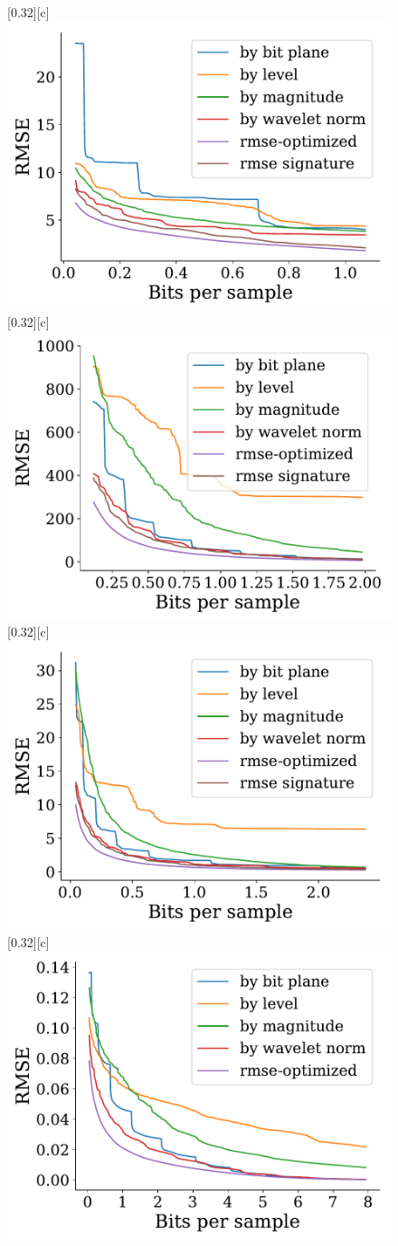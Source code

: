 \documentclass{article}
\begin{document}
\begin{figure}[htb]
        \centering
        [0.32\linewidth][c]{%
               \includegraphics[width=0.3\linewidth]{img/supplementary/rmse-optimized-kingsnake}}
        [0.32\linewidth][c]{%
               \includegraphics[width=0.3\linewidth]{img/supplementary/rmse-optimized-flame}}
        [0.32\linewidth][c]{%
               \includegraphics[width=0.3\linewidth]{img/supplementary/rmse-optimized-csafe}}
        [0.32\linewidth][c]{%
               \includegraphics[width=0.3\linewidth]{img/supplementary/rmse-optimized-enzo-v}}

\end{figure}
\end{document}
